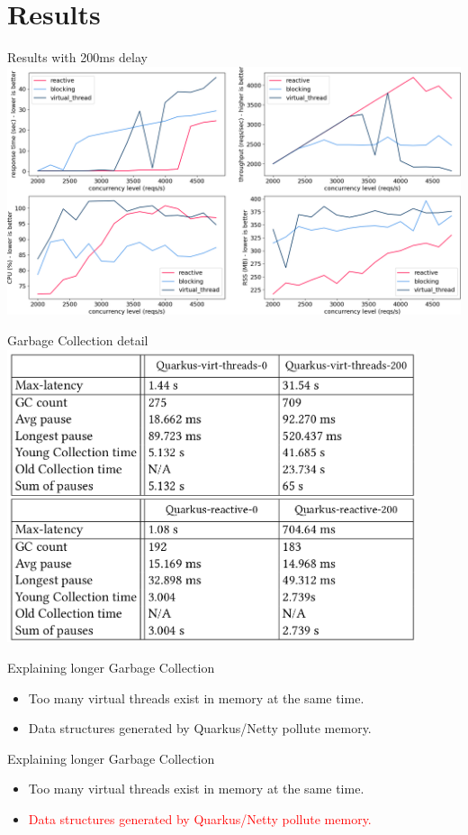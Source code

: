 \documentclass{beamer}
\begin{document}
\section{Results}
\begin{frame}{Results with 200ms delay}
    \includegraphics[width=\textwidth]{assets/nano_200_19.0.1.png}
\end{frame}
\begin{frame}{Garbage Collection detail}
    \includegraphics[width=0.9\textwidth]{assets/GC_measures.png}
\end{frame}
\begin{frame}{Explaining longer Garbage Collection}
    \begin{itemize}
        \item Too many virtual threads exist in memory at the same time.   
        \item Data structures generated by Quarkus/Netty pollute memory.
    \end{itemize}
\end{frame}
\begin{frame}{Explaining longer Garbage Collection}
    \begin{itemize}
        \item Too many virtual threads exist in memory at the same time.   
        \item \textcolor{red}{Data structures generated by Quarkus/Netty pollute memory.}
    \end{itemize}
\end{frame}
\end{document}
